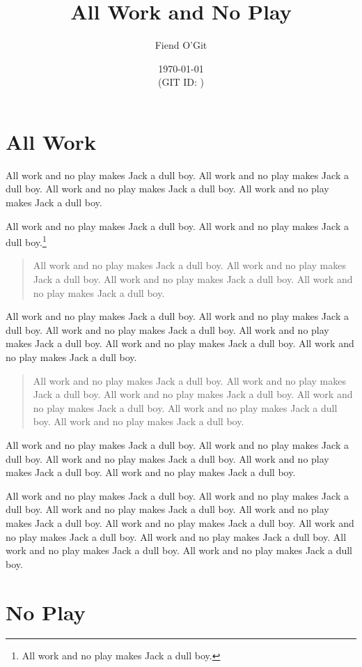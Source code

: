 \documentclass[12pt]{article}
\author{Fiend O'Git}
\title{All Work and No Play}
\date{\today\\{\footnotesize (GIT ID: \texttt{\githeadcommit})}}
\begin{document}
\maketitle
\thispagestyle{empty}

\section{All Work}

All work and no play makes Jack a dull boy.
All work and no play makes Jack a dull boy.
All work and no play makes Jack a dull boy.
All work and no play makes Jack a dull boy.

All work and no play makes Jack a dull boy.
All work and no play makes Jack a dull boy.\footnote{
All work and no play makes Jack a dull boy.}
\begin{quote}
All work and no play makes Jack a dull boy.
All work and no play makes Jack a dull boy.
All work and no play makes Jack a dull boy.
All work and no play makes Jack a dull boy.
\end{quote}
All work and no play makes Jack a dull boy.
All work and no play makes Jack a dull boy.
All work and no play makes Jack a dull boy.
All work and no play makes Jack a dull boy.
All work and no play makes Jack a dull boy.
All work and no play makes Jack a dull boy.

\begin{quote}
All work and no play makes Jack a dull boy.
All work and no play makes Jack a dull boy.
All work and no play makes Jack a dull boy.
All work and no play makes Jack a dull boy.
All work and no play makes Jack a dull boy.
All work and no play makes Jack a dull boy.
\end{quote}

All work and no play makes Jack a dull boy.
All work and no play makes Jack a dull boy.
All work and no play makes Jack a dull boy.
All work and no play makes Jack a dull boy.
All work and no play makes Jack a dull boy.

All work and no play makes Jack a dull boy.
All work and no play makes Jack a dull boy.
All work and no play makes Jack a dull boy.
All work and no play makes Jack a dull boy.
All work and no play makes Jack a dull boy.
All work and no play makes Jack a dull boy.
All work and no play makes Jack a dull boy.
All work and no play makes Jack a dull boy.
All work and no play makes Jack a dull boy.

\section{No Play}
\end{document}
